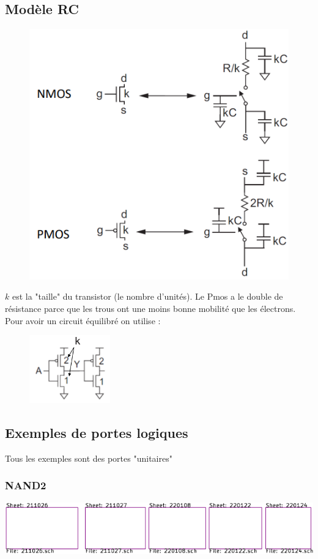 \documentclass[resume]{subfiles}
\begin{document}
\begin{multicols}{3}
\subsection{Modèle RC}
\begin{figure}[H]
\centering
\includegraphics[width=\columnwidth]{img_40.png}
\end{figure}
$k$ est la "taille" du transistor (le nombre d'unités). Le Pmos a le double de résistance parce que les trous ont une moins bonne mobilité que les électrons. Pour avoir un circuit équilibré on utilise :
\begin{figure}[H]
\centering
\includegraphics[width=3.5cm]{img_41.png}
\end{figure}
\subsection{Exemples de portes logiques}
Tous les exemples sont des portes "unitaires"
\subsubsection{NAND2}
\begin{center}
\includegraphics[scale=1,page=20]{../kicad/resume-crop.pdf}
\end{center}

\end{multicols}
\end{document}
